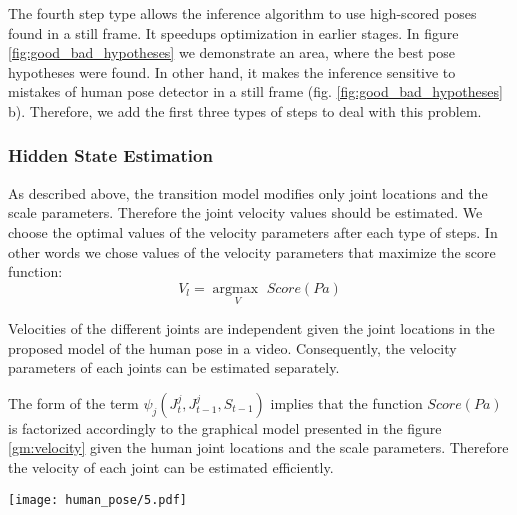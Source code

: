 The fourth step type allows the inference algorithm to use high-scored poses found in a still frame. It speedups optimization in earlier stages. In figure \ref{fig:good_bad_hypotheses} we demonstrate an area, where the best pose hypotheses were found. In other hand, it makes the inference sensitive to mistakes of human pose detector in a still frame (fig. \ref{fig:good_bad_hypotheses} b). Therefore, we add the first three types of steps to deal with this problem.

\subsubsection{Hidden State Estimation}

As described above, the transition model modifies only joint locations and the scale parameters.
Therefore the joint velocity values should be estimated. We choose the optimal values of the velocity parameters after each type of steps. In other words we chose values of the velocity parameters that maximize the score function:
\[
	V_l = \underset{V}{\mathop{argmax\:}} {Score(Pa)}
\]

Velocities of the different joints are independent given the joint locations in the proposed model of the human pose in a video. Consequently, the velocity parameters of each joints can be estimated separately.

The form of the term $\psi_j(J_t^j, J_{t-1}^j, S_{t-1})$ implies that the function $Score(Pa)$ is factorized accordingly to the graphical model presented in the figure \ref{gm:velocity} given the human joint locations and the scale parameters. Therefore the velocity of each joint can be estimated efficiently.

\begin{figure*}[!t] 
	\begin{center}
		\texttt{[image: human\_pose/5.pdf]}
%		
	\end{center}
	\caption{A graphical model for a joint velocity estimation. Nodes of the observed variables are shown in gray.} \label{gm:velocity}
\end{figure*}

